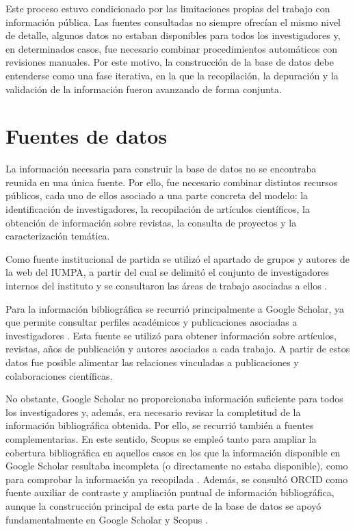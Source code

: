 \documentclass[11pt,spanish,listoffigures,listoftables]{tfgetsinf}
\begin{document}
Este proceso estuvo condicionado por las limitaciones propias del trabajo con información pública. Las fuentes consultadas no siempre ofrecían el mismo nivel de detalle, algunos datos no estaban disponibles para todos los investigadores y, en determinados casos, fue necesario combinar procedimientos automáticos con revisiones manuales. Por este motivo, la construcción de la base de datos debe entenderse como una fase iterativa, en la que la recopilación, la depuración y la validación de la información fueron avanzando de forma conjunta.

\section{Fuentes de datos}

La información necesaria para construir la base de datos no se encontraba reunida en una única fuente. Por ello, fue necesario combinar distintos recursos públicos, cada uno de ellos asociado a una parte concreta del modelo: la identificación de investigadores, la recopilación de artículos científicos, la obtención de información sobre revistas, la consulta de proyectos y la caracterización temática.

Como fuente institucional de partida se utilizó el apartado de grupos y autores de la web del IUMPA, a partir del cual se delimitó el conjunto de investigadores internos del instituto y se consultaron las áreas de trabajo asociadas a ellos \cite{web_iumpa}.

Para la información bibliográfica se recurrió principalmente a Google Scholar, ya que permite consultar perfiles académicos y publicaciones asociadas a investigadores \cite{google_scholar}. Esta fuente se utilizó para obtener información sobre artículos, revistas, años de publicación y autores asociados a cada trabajo. A partir de estos datos fue posible alimentar las relaciones vinculadas a publicaciones y colaboraciones científicas.

No obstante, Google Scholar no proporcionaba información suficiente para todos los investigadores y, además, era necesario revisar la completitud de la información bibliográfica obtenida. Por ello, se recurrió también a fuentes complementarias. En este sentido, Scopus se empleó tanto para ampliar la cobertura bibliográfica en aquellos casos en los que la información disponible en Google Scholar resultaba incompleta (o directamente no estaba disponible), como para comprobar la información ya recopilada \cite{scopus}. Además, se consultó ORCID como fuente auxiliar de contraste y ampliación puntual de información bibliográfica, aunque la construcción principal de esta parte de la base de datos se apoyó fundamentalmente en Google Scholar y Scopus \cite{orcid}.
\end{document}
